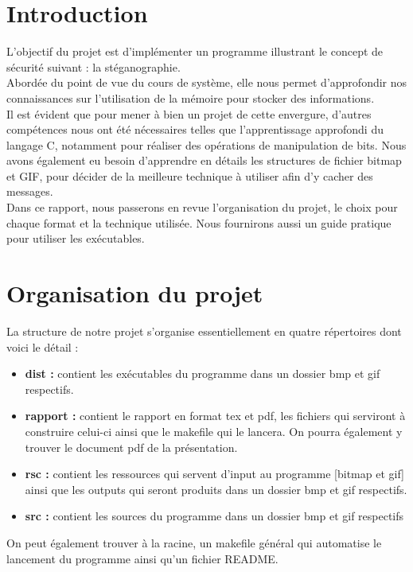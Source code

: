 \section{Introduction}
L'objectif du projet est d'implémenter un programme illustrant le concept de sécurité suivant : la stéganographie.\\

Abordée du point de vue du cours de système, elle nous permet d'approfondir nos connaissances sur l'utilisation de la mémoire
pour stocker des informations.\\

Il est évident que pour mener à bien un projet de cette envergure, d'autres compétences nous ont été nécessaires
telles que l'apprentissage approfondi du langage C, notamment pour réaliser des opérations de manipulation de bits.
Nous avons également eu besoin d'apprendre en détails les structures de fichier bitmap et GIF, pour décider de la meilleure technique à
utiliser afin d'y cacher des messages.\\

Dans ce rapport, nous passerons en revue l'organisation du projet, le choix pour chaque format et la technique utilisée. 
Nous fournirons aussi un guide pratique pour utiliser les exécutables. 

\vspace{1.5cm}


\newpage
\section{Organisation du projet}
La structure de notre projet s'organise essentiellement en quatre répertoires dont voici le détail :\\ 

\begin{itemize}
    \item \textbf{dist :} contient les exécutables du programme dans un dossier bmp et gif respectifs.
    \item \textbf{rapport :} contient le rapport en format tex et pdf, les fichiers qui serviront à construire celui-ci 
    ainsi que le makefile qui le lancera. On pourra également y trouver le document pdf de la présentation.
    \item \textbf{rsc :} contient les ressources qui servent d'input au programme [bitmap et gif] ainsi que les outputs 
    qui seront produits dans un dossier bmp et 
    gif respectifs.
    \item \textbf{src :} contient les sources du programme dans un dossier bmp et gif respectifs\\
\end{itemize}
On peut également trouver à la racine, un makefile général qui automatise le lancement du programme ainsi qu'un fichier README.

